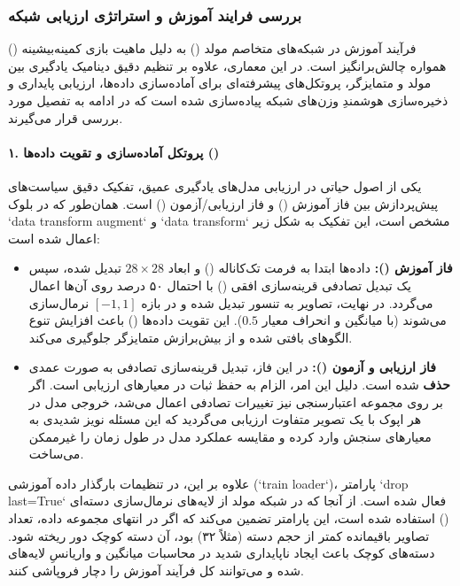 \documentclass{article}
\begin{document}
\subsubsection{بررسی فرایند آموزش و استراتژی ارزیابی شبکه}

فرآیند آموزش در شبکه‌های متخاصم مولد () به دلیل ماهیت بازی کمینه‌بیشینه () همواره چالش‌برانگیز است. در این معماری، علاوه بر تنظیم دقیق دینامیک یادگیری بین مولد و متمایزگر، پروتکل‌های پیشرفته‌ای برای آماده‌سازی داده‌ها، ارزیابی پایداری و ذخیره‌سازی هوشمندِ وزن‌های شبکه پیاده‌سازی شده است که در ادامه به تفصیل مورد بررسی قرار می‌گیرند.

\paragraph{۱. پروتکل آماده‌سازی و تقویت داده‌ها ()}
یکی از اصول حیاتی در ارزیابی مدل‌های یادگیری عمیق، تفکیک دقیق سیاست‌های پیش‌پردازش بین فاز آموزش () و فاز ارزیابی/آزمون () است. همان‌طور که در بلوک `data transform augment` و `data transform` مشخص است، این تفکیک به شکل زیر اعمال شده است:

\begin{itemize}
	\item \textbf{فاز آموزش ():} داده‌ها ابتدا به فرمت تک‌کاناله () و ابعاد $28 \times 28$ تبدیل شده، سپس یک تبدیل تصادفی قرینه‌سازی افقی () با احتمال ۵۰ درصد روی آن‌ها اعمال می‌گردد. در نهایت، تصاویر به تنسور تبدیل شده و در بازه $[-1, 1]$ نرمال‌سازی می‌شوند (با میانگین و انحراف معیار $0.5$). این تقویت داده‌ها () باعث افزایش تنوع الگوهای بافتی شده و از بیش‌برازش متمایزگر جلوگیری می‌کند.
	\item \textbf{فاز ارزیابی و آزمون ():} در این فاز، تبدیل قرینه‌سازی تصادفی به صورت عمدی \textbf{حذف} شده است. دلیل این امر، الزام به حفظ ثبات در معیارهای ارزیابی است. اگر بر روی مجموعه اعتبارسنجی نیز تغییرات تصادفی اعمال می‌شد، خروجی مدل در هر اپوک با یک تصویر متفاوت ارزیابی می‌گردید که این مسئله نویز شدیدی به معیارهای سنجش وارد کرده و مقایسه عملکرد مدل در طول زمان را غیرممکن می‌ساخت.
\end{itemize}

علاوه بر این، در تنظیمات بارگذار داده آموزشی (`train loader`)، پارامتر `drop last=True` فعال شده است. از آنجا که در شبکه مولد از لایه‌های نرمال‌سازی دسته‌ای () استفاده شده است، این پارامتر تضمین می‌کند که اگر در انتهای مجموعه داده، تعداد تصاویر باقیمانده کمتر از حجم دسته (مثلاً ۳۲) بود، آن دسته کوچک دور ریخته شود. دسته‌های کوچک باعث ایجاد ناپایداری شدید در محاسبات میانگین و واریانسِ لایه‌های  شده و می‌توانند کل فرآیند آموزش را دچار فروپاشی کنند.
\end{document}
